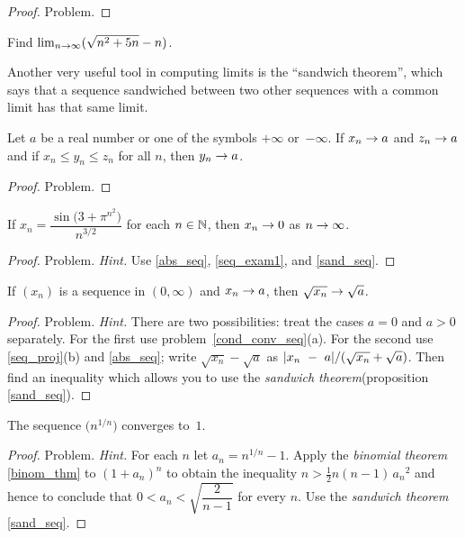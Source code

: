 \begin{proof} Problem.  \ns  \end{proof}

\begin{prob} Find $\lim_{n \rightarrow \infty}(\sqrt{n^2 + 5n} - n)$.
\end{prob}

Another very useful tool in computing limits is the ``sandwich theorem'',  which says that a
sequence sandwiched between two other sequences with a common limit has that same limit.

\begin{prop}\label{sand_seq}
Let $a$ be a real number or one of the symbols $+\infty$ or~$-\infty$.  If $x_n \rightarrow a$ and
$z_n \rightarrow a$ and if $x_n \le y_n \le z_n$ for all $n$, then $y_n \rightarrow a$.
\end{prop}

\begin{proof} Problem. \ns  \end{proof}

\begin{exam} If $x_n = \dfrac{\sin\bigl(3 + \pi^{n^2}\bigr)}{n^{3/2}}$ for each $n \in \mathbb{N}$,
then $x_n \rightarrow 0$ as $n \rightarrow \infty$.
\end{exam}

\begin{proof} Problem. \emph{Hint.} Use \ref{abs_seq}, \ref{seq_exam1}, and \ref{sand_seq}.
  \ns \end{proof}


\begin{exam} If $(x_n)$ is a sequence in $(0,\infty)$  and $x_n \rightarrow a$, then
$\sqrt{x_n} \rightarrow \sqrt a$.
\end{exam}

\begin{proof} Problem. \emph{Hint.}  There are two possibilities: treat the cases
$a = 0$ and $a > 0$ separately. For the first use problem~\ref{cond_conv_seq}(a).  For the
second use \ref{seq_proj}(b) and \ref{abs_seq}; write $\sqrt{x_n} - \sqrt a$ as
$\lvert x_n~-~a\rvert/(\sqrt{x_n} + \sqrt a)$. Then find an inequality which allows you to use the
\emph{sandwich theorem}(proposition \ref{sand_seq}). \ns
\end{proof}

\begin{exam}\label{4exam2} The sequence $\bigl(n^{1/n}\bigr)$ converges to~$1$.
\end{exam}

\begin{proof} Problem. \emph{Hint.}  For each $n$ let $a_n = n^{1/n}-1$.  Apply the
\emph{binomial theorem} \ref{binom_thm} to $(1+a_n)^n$ to obtain the inequality
$n>\frac12n(n-1)\,{a_n}^2$ and hence to conclude that $0<a_n<\sqrt{\dfrac2{n-1}}$ for every
$n$. Use the \emph{sandwich theorem} \ref{sand_seq}.  \ns
\end{proof}










